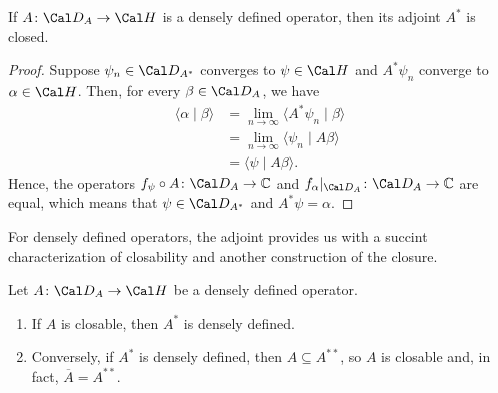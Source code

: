 \begin{proposition}
  \label{prop:adj-closed}
  If \(A\colon\Cal D_A\to\Cal H\) is a densely defined operator, then
  its adjoint \(A^*\) is closed.
\end{proposition}
\begin{proof}
  Suppose \(\psi_n\in\Cal D_{A^*}\) converges to \(\psi\in\Cal H\) and
  \(A^*\psi_n\) converge to \(\alpha\in\Cal H\).
  Then, for every \(\beta\in\Cal D_A\), we have
  \begin{align}
    \langle \alpha \mid \beta \rangle
    &= \lim_{n\to\infty}\langle A^*\psi_n \mid \beta \rangle \\
    &= \lim_{n\to\infty}\langle \psi_n \mid A\beta \rangle \\
    &= \langle \psi \mid A\beta \rangle.
  \end{align}
  Hence, the operators \(f_\psi\circ A\colon \Cal D_A\to\C\) and
  \(f_\alpha|_{\Cal D_A}\colon\Cal D_A\to\C\) are equal,
  which means that \(\psi\in\Cal D_{A^*}\) and \(A^*\psi=\alpha\).
\end{proof}

For densely defined operators, the adjoint provides us with a succint
characterization of closability and another construction of the
closure.

\begin{proposition}
  \label{prop:closableext}
  Let \(A\colon\Cal D_A\to\Cal H\) be a densely defined operator.
  \begin{enumerate}[label=(\roman*)]
    \item 
      If $A$ is closable, then \(A^*\) is densely defined.
    \item
      Conversely, if $A^*$ is densely defined,
      then \(A\subseteq A^{**}\), so \(A\) is closable and, in fact,
      $\overline{A}=A^{**}$.
  \end{enumerate}
\end{proposition}

